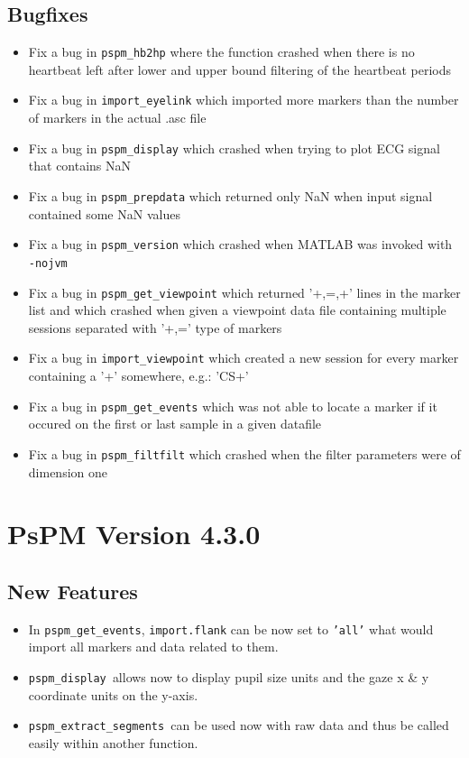 \documentclass[english]{article}
\numberwithin{equation}{section}
\numberwithin{figure}{section}
\begin{document}
\subsection*{Bugfixes}
\begin{itemize}
\item Fix a bug in \texttt{pspm\_hb2hp} where the function crashed when
there is no heartbeat left after lower and upper bound filtering of
the heartbeat periods
\item Fix a bug in \texttt{import\_eyelink} which imported more markers
than the number of markers in the actual .asc file
\item Fix a bug in \texttt{pspm\_display} which crashed when trying to plot
ECG signal that contains NaN
\item Fix a bug in \texttt{pspm\_prepdata} which returned only NaN when
input signal contained some NaN values
\item Fix a bug in \texttt{pspm\_version} which crashed when MATLAB was
invoked with \texttt{-nojvm}
\item Fix a bug in \texttt{pspm\_get\_viewpoint} which returned '+,=,+'
lines in the marker list and which crashed when given a viewpoint
data file containing multiple sessions separated with '+,=' type of
markers
\item Fix a bug in \texttt{import\_viewpoint} which created a new session
for every marker containing a '+' somewhere, e.g.: 'CS+'
\item Fix a bug in \texttt{pspm\_get\_events} which was not able to locate
a marker if it occured on the first or last sample in a given datafile
\item Fix a bug in \texttt{pspm\_filtfilt} which crashed when the filter
parameters were of dimension one
\end{itemize}

\section{PsPM Version 4.3.0}

\subsection*{New Features}
\begin{itemize}
\item In \texttt{pspm\_get\_events}, \texttt{import.flank} can be now set
to \texttt{'all'} what would import all markers and data related to
them.
\item \texttt{pspm\_display }allows now to display pupil size units and
the gaze x \& y coordinate units on the y-axis.
\item \texttt{pspm\_extract\_segments }can be used now with raw data and
thus be called easily within another function.
\end{itemize}
\end{document}
